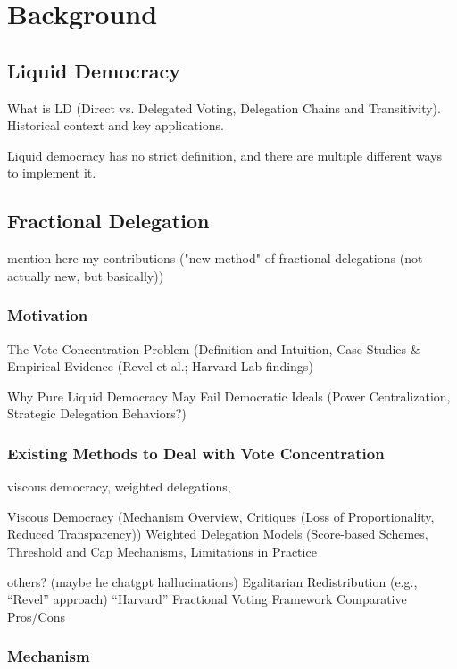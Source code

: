 \graphicspath{{./figures/}}

\chapter{Background}

\section{Liquid Democracy}

What is LD (Direct vs. Delegated Voting, Delegation Chains and Transitivity). Historical context and key applications.

Liquid democracy has no strict definition, and there are multiple different ways to implement it. \cite{fordLiquidPerspectiveDemocratic2020}

\section{Fractional Delegation}

mention here my contributions ("new method" of fractional delegations (not actually new, but basically))

\subsection{Motivation}
The Vote-Concentration Problem (Definition and Intuition, Case Studies & Empirical Evidence (Revel et al.; Harvard Lab findings)

Why Pure Liquid Democracy May Fail Democratic Ideals (Power Centralization, Strategic Delegation Behaviors?)

\subsection{Existing Methods to Deal with Vote Concentration}

viscous democracy, weighted delegations, 

Viscous Democracy (Mechanism Overview, Critiques (Loss of Proportionality, Reduced Transparency))
Weighted Delegation Models (Score-based Schemes, Threshold and Cap Mechanisms, Limitations in Practice

others? (maybe he chatgpt hallucinations)
Egalitarian Redistribution (e.g., “Revel” approach)
“Harvard” Fractional Voting Framework
 Comparative Pros/Cons


\subsection{Mechanism}


